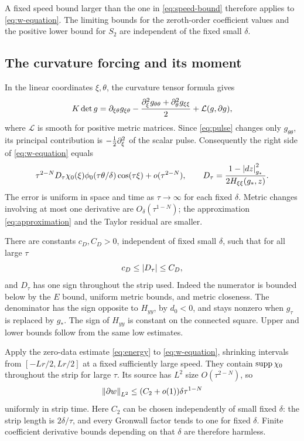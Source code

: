 A fixed speed bound larger than the one in \eqref{eq:speed-bound}
therefore applies to \eqref{eq:w-equation}. The limiting bounds
for the zeroth-order coefficient values and the positive lower
bound for \(S_2\) are independent of the fixed small \(\delta\).

\subsection{The curvature forcing and its moment}

In the linear coordinates \(\xi,\theta\), the curvature tensor formula
gives
\begin{equation}\label{eq:curvature-density}
K\det g
=\partial_{\xi\theta}g_{\xi\theta}
-\frac{\partial_\xi^2g_{\theta\theta}+\partial_\theta^2g_{\xi\xi}}2
+\mathcal L(g,\partial g),
\end{equation}
where \(\mathcal L\) is smooth for positive metric matrices.
Since \eqref{eq:pulse} changes only \(g_{\theta\theta}\),
its principal contribution is \(-\tfrac12\partial_\xi^2\)
of the scalar pulse. Consequently the right side of
\eqref{eq:w-equation} equals
\begin{equation}\label{eq:forcing}
\tau^{2-N}D_\tau\chi_0(\xi)\phi_0(\tau\theta/\delta)
                   \cos(\tau\xi)+o(\tau^{2-N}),
\qquad
D_\tau=\frac{1-\left\lvert dz\right\rvert_{g_*}^2}{2H_{\xi\xi}(g_*,z)}.
\end{equation}
The error is uniform in space and time as \(\tau\to\infty\)
for each fixed \(\delta\). Metric changes involving at most one
derivative are \(O_\delta(\tau^{1-N})\); the approximation
\eqref{eq:approximation} and the Taylor residual are smaller.

There are constants \(c_D,C_D>0\), independent of fixed small
\(\delta\), such that for all large \(\tau\)
\[
c_D\le\left\lvert D_\tau\right\rvert\le C_D,
\]
and \(D_\tau\) has one sign throughout the strip used.
Indeed the numerator is bounded below by the \(E\) bound,
uniform metric bounds, and metric closeness. The denominator
has the sign opposite to \(H_{yy}\), by \(d_0<0\), and stays
nonzero when \(g_\tau\) is replaced by \(g_*\).
The sign of \(H_{yy}\) is constant on the connected square.
Upper and lower bounds follow from the same low estimates.

Apply the zero-data estimate \eqref{eq:energy} to
\eqref{eq:w-equation}, shrinking intervals from
\([-Lr/2,Lr/2]\) at a fixed sufficiently large speed.
They contain \(\operatorname{supp}\chi_0\) throughout the strip for large
\(\tau\). Its source has \(L^2\) size \(O(\tau^{2-N})\),
so
\begin{equation}\label{eq:short-energy}
\left\lVert\partial w\right\rVert_{L^2}\le(C_2+o(1))\delta\tau^{1-N}
\end{equation}
uniformly in strip time.
Here \(C_2\) can be chosen independently of small fixed
\(\delta\): the strip length is \(2\delta/\tau\), and every
Gronwall factor tends to one for fixed \(\delta\).
Finite coefficient derivative bounds depending on that \(\delta\)
are therefore harmless.

